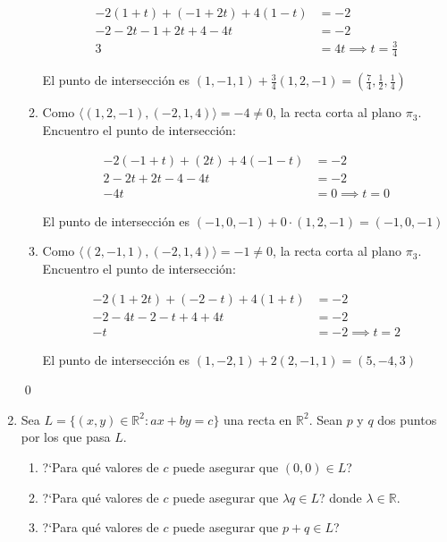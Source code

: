 \begin{enumerate}[resume,topsep=6pt, itemsep=.4cm]
\begin{enumerate}
\begin{equation*}
\begin{array}{rl}
-2 (1+t) + (-1+2t) + 4 (1-t) &= -2 \\
-2 -2t -1 +2t +4 -4t  &= -2 \\
3 &= 4t \implies \boxed{t=\frac{3}{4}}
\end{array}
\end{equation*}

El punto de intersección es $(1,-1,1) + \frac{3}{4} (1,2,-1) = \boxed{ \left( \frac{7}{4} , \frac{1}{2} , \frac{1}{4} \right) }$

\item Como $\langle (1,2,-1),(-2,1,4) \rangle = -4 \neq 0 $, la recta corta al plano $\pi_3$. Encuentro el punto de intersección:

\begin{equation*}
\begin{array}{rl}
-2 (-1+t) + (2t) + 4 (-1-t) &= -2 \\
2-2t+2t-4-4t &= -2 \\
-4t &= 0 \implies \boxed{t=0}
\end{array}
\end{equation*}

El punto de intersección es $(-1,0,-1) + 0 \cdot (1,2,-1) = \boxed{ (-1,0,-1) }$

\item Como $\langle (2,-1,1),(-2,1,4) \rangle  = -1 \neq 0 $, la recta corta al plano $\pi_3$. Encuentro el punto de intersección:

\begin{equation*}
\begin{array}{rl}
-2 (1+2t) + (-2-t) + 4 (1+t) &= -2 \\
-2-4t-2-t+4 + 4t &= -2 \\
-t &= -2 \implies \boxed{t=2}
\end{array}
\end{equation*}

El punto de intersección es $(1,-2,1) + 2 (2,-1,1) = \boxed{ ( 5,-4,3 ) }$

\end{enumerate}

\qed

\item\label{rectas como subespacio} Sea $L=\{(x,y)\in\mathbb{R}^2 : ax+by=c\}$ una recta en $\mathbb{R}^2$. Sean $p$ y $q$ dos puntos por los que pasa $L$.
\begin{enumerate}
 \item ?`Para qué valores de $c$ puede asegurar que $(0,0)\in L$?
 \item ?`Para qué valores de $c$ puede asegurar que $\lambda q\in L$? donde $\lambda\in\mathbb{R}$.
 \item ?`Para qué valores de $c$ puede asegurar que $p+q\in L$?
\end{enumerate}


\end{enumerate}
